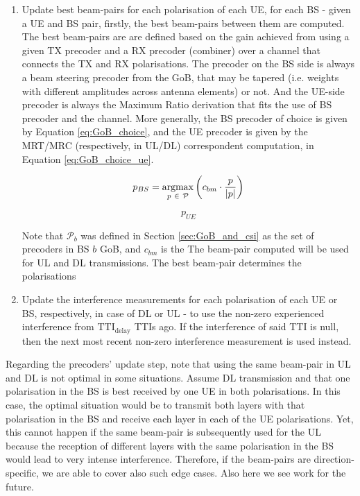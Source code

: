 \begin{enumerate}
    \item Update best beam-pairs for each polarisation of each UE, for each BS - given a UE and BS pair, firstly, the best beam-pairs between them are computed. The best beam-pairs are are defined based on the gain achieved from using a given TX precoder and a RX precoder (combiner) over a channel that connects the TX and RX polarisations. The precoder on the BS side is always a beam steering precoder from the GoB, that may be tapered (i.e. weights with different amplitudes across antenna elements) or not. And the UE-side precoder is always the Maximum Ratio derivation that fits the use of BS precoder and the channel. More generally, the BS precoder of choice is given by Equation \eqref{eq:GoB_choice}, and the UE precoder is given by the MRT/MRC (respectively, in UL/DL) correspondent computation, in Equation \ref{eq:GoB_choice_ue}.
    
    \begin{equation} \label{eq:GoB_choice}
        p_{BS} = \operatorname*{argmax}_{p \ \in \ \mathcal{P}} \left(c_{b m} \cdot \frac{p}{|p|} \right)
    \end{equation}
    
    \begin{equation} \label{eq:GoB_choice_ue}
        p_{UE}
    \end{equation}

    Note that $\mathcal{P}_b$ was defined in Section \ref{sec:GoB_and_csi} as the set of precoders in BS $b$ \ac{GoB}, and $c_{bm}$ is the
    The beam-pair computed will be used for UL and DL transmissions.
    The best beam-pair determines the polarisations
    \item Update the interference measurements for each polarisation of each UE or BS, respectively, in case of DL or UL - to use the non-zero experienced interference from $\text{TTI}_\text{delay}$ TTIs ago. If the interference of said TTI is null, then the next most recent non-zero interference measurement is used instead.
\end{enumerate}

Regarding the precoders' update step, note that using the same beam-pair in UL and DL is not optimal in some situations. Assume DL transmission and that one polarisation in the BS is best received by one UE in both polarisations. In this case, the optimal situation would be to transmit both layers with that polarisation in the BS and receive each layer in each of the UE polarisations. Yet, this cannot happen if the same beam-pair is subsequently used for the UL because the reception of different layers with the same polarisation in the BS would lead to very intense interference. Therefore, if the beam-pairs are direction-specific, we are able to cover also such edge cases. Also here we see work for the future.


